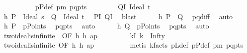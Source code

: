 \begin{isabellebody}
\ \ \ \ \ \ \ \ \ \ pPdef\ pm\ pq{\isacharunderscore}{\kern0pt}pts{\isacharparenright}{\kern0pt}\isanewline
\ \ \isamarkupfalse%
\isanewline
\ \ \ \ \isamarkupfalse%
\ QI{\isacharcolon}{\kern0pt}\ {\isacharparenleft}{\kern0pt}Ideal\ t{\isacharparenright}{\kern0pt}\isanewline
\ \ \ \ \isamarkupfalse%
\ h{}{\isacharcolon}{\kern0pt}\ {\isachardoublequoteopen}P\ {\isacharequal}{\kern0pt}\ Ideal\ s\ {\isasymand}\ Q\ {\isacharequal}{\kern0pt}\ Ideal\ t{\isachardoublequoteclose}\ \isamarkupfalse%
\ PI\ QI\ \isamarkupfalse%
\ blast\isanewline
\ \ \ \ \isamarkupfalse%
\ h{}{\isacharcolon}{\kern0pt}\ {\isachardoublequoteopen}P\ {\isasymnoteq}\ Q{\isachardoublequoteclose}\ \isamarkupfalse%
\ pq{\isacharunderscore}{\kern0pt}diff\ \isamarkupfalse%
\ auto\isanewline
\ \ \ \ \isamarkupfalse%
\ h{}{\isacharcolon}{\kern0pt}\ {\isachardoublequoteopen}P\ {\isasymin}\ pPoints{\isachardoublequoteclose}\ \isamarkupfalse%
\ pq{\isacharunderscore}{\kern0pt}pts\ \isamarkupfalse%
\ auto\isanewline
\ \ \ \ \isamarkupfalse%
\ h{}{\isacharcolon}{\kern0pt}\ {\isachardoublequoteopen}Q\ {\isasymin}\ pPoints{\isachardoublequoteclose}\ \isamarkupfalse%
\ pq{\isacharunderscore}{\kern0pt}pts\ \isamarkupfalse%
\ auto\isanewline
\ \ \ \ \isamarkupfalse%
\ two{\isacharunderscore}{\kern0pt}ideal{\isacharunderscore}{\kern0pt}is{\isacharunderscore}{\kern0pt}infinite\ \ {\isacharbrackleft}{\kern0pt}OF\ h{}\ h{}\ ap\ {\isacharunderscore}{\kern0pt}\ {\isacharunderscore}{\kern0pt}\ {\isacharunderscore}{\kern0pt}{\isacharbrackright}{\kern0pt}\isanewline
\ \ \ \ \isamarkupfalse%
\ kI{\isacharcolon}{\kern0pt}\ {\isachardoublequoteopen}k\ {\isacharequal}{\kern0pt}\ Infty{\isachardoublequoteclose}\ \isamarkupfalse%
\ two{\isacharunderscore}{\kern0pt}ideal{\isacharunderscore}{\kern0pt}is{\isacharunderscore}{\kern0pt}infinite\ {\isacharbrackleft}{\kern0pt}OF\ h{}\ h{}\ ap\ {\isacharunderscore}{\kern0pt}\ {\isacharunderscore}{\kern0pt}\ {\isacharunderscore}{\kern0pt}{\isacharbrackright}{\kern0pt}\ \isanewline
\ \ \ \ \isamarkupfalse%
\ {\isacharparenleft}{\kern0pt}metis\ k{\isacharunderscore}{\kern0pt}facts\ pLdef\ pPdef\ pm\ pq{\isacharunderscore}{\kern0pt}pts{\isacharparenright}{\kern0pt}\isanewline

\end{isabellebody}
